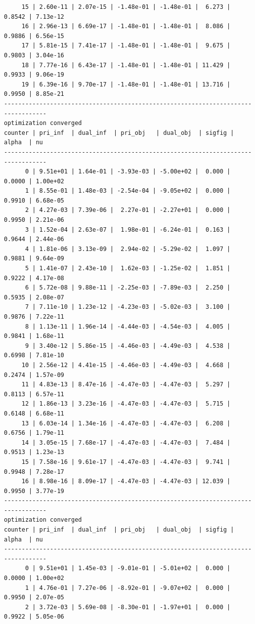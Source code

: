 \documentclass[
]{book}
\begin{document}
\begin{verbatim}
     15 | 2.60e-11 | 2.07e-15 | -1.48e-01 | -1.48e-01 |  6.273 | 0.8542 | 7.13e-12
     16 | 2.96e-13 | 6.69e-17 | -1.48e-01 | -1.48e-01 |  8.086 | 0.9886 | 6.56e-15
     17 | 5.81e-15 | 7.41e-17 | -1.48e-01 | -1.48e-01 |  9.675 | 0.9803 | 3.04e-16
     18 | 7.77e-16 | 6.43e-17 | -1.48e-01 | -1.48e-01 | 11.429 | 0.9933 | 9.06e-19
     19 | 6.39e-16 | 9.70e-17 | -1.48e-01 | -1.48e-01 | 13.716 | 0.9950 | 8.85e-21
----------------------------------------------------------------------------------
optimization converged
counter | pri_inf  | dual_inf  | pri_obj   | dual_obj  | sigfig | alpha  | nu 
----------------------------------------------------------------------------------
      0 | 9.51e+01 | 1.64e-01 | -3.93e-03 | -5.00e+02 |  0.000 | 0.0000 | 1.00e+02
      1 | 8.55e-01 | 1.48e-03 | -2.54e-04 | -9.05e+02 |  0.000 | 0.9910 | 6.68e-05
      2 | 4.27e-03 | 7.39e-06 |  2.27e-01 | -2.27e+01 |  0.000 | 0.9950 | 2.21e-06
      3 | 1.52e-04 | 2.63e-07 |  1.98e-01 | -6.24e-01 |  0.163 | 0.9644 | 2.44e-06
      4 | 1.81e-06 | 3.13e-09 |  2.94e-02 | -5.29e-02 |  1.097 | 0.9881 | 9.64e-09
      5 | 1.41e-07 | 2.43e-10 |  1.62e-03 | -1.25e-02 |  1.851 | 0.9222 | 4.17e-08
      6 | 5.72e-08 | 9.88e-11 | -2.25e-03 | -7.89e-03 |  2.250 | 0.5935 | 2.08e-07
      7 | 7.11e-10 | 1.23e-12 | -4.23e-03 | -5.02e-03 |  3.100 | 0.9876 | 7.22e-11
      8 | 1.13e-11 | 1.96e-14 | -4.44e-03 | -4.54e-03 |  4.005 | 0.9841 | 1.68e-11
      9 | 3.40e-12 | 5.86e-15 | -4.46e-03 | -4.49e-03 |  4.538 | 0.6998 | 7.81e-10
     10 | 2.56e-12 | 4.41e-15 | -4.46e-03 | -4.49e-03 |  4.668 | 0.2474 | 1.57e-09
     11 | 4.83e-13 | 8.47e-16 | -4.47e-03 | -4.47e-03 |  5.297 | 0.8113 | 6.57e-11
     12 | 1.86e-13 | 3.23e-16 | -4.47e-03 | -4.47e-03 |  5.715 | 0.6148 | 6.68e-11
     13 | 6.03e-14 | 1.34e-16 | -4.47e-03 | -4.47e-03 |  6.208 | 0.6756 | 1.79e-11
     14 | 3.05e-15 | 7.68e-17 | -4.47e-03 | -4.47e-03 |  7.484 | 0.9513 | 1.23e-13
     15 | 7.58e-16 | 9.61e-17 | -4.47e-03 | -4.47e-03 |  9.741 | 0.9948 | 7.28e-17
     16 | 8.98e-16 | 8.09e-17 | -4.47e-03 | -4.47e-03 | 12.039 | 0.9950 | 3.77e-19
----------------------------------------------------------------------------------
optimization converged
counter | pri_inf  | dual_inf  | pri_obj   | dual_obj  | sigfig | alpha  | nu 
----------------------------------------------------------------------------------
      0 | 9.51e+01 | 1.45e-03 | -9.01e-01 | -5.01e+02 |  0.000 | 0.0000 | 1.00e+02
      1 | 4.76e-01 | 7.27e-06 | -8.92e-01 | -9.07e+02 |  0.000 | 0.9950 | 2.07e-05
      2 | 3.72e-03 | 5.69e-08 | -8.30e-01 | -1.97e+01 |  0.000 | 0.9922 | 5.05e-06

\end{verbatim}
\end{document}
